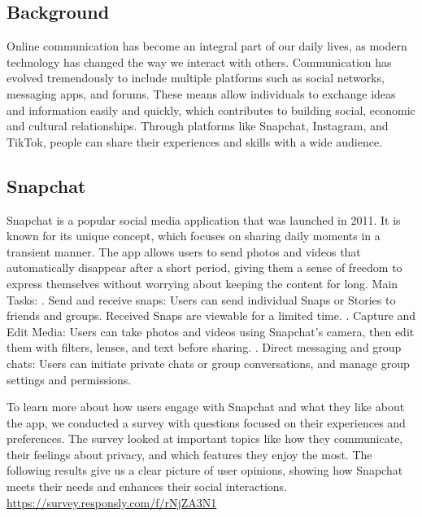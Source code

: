 \documentclass{article}
\begin{document}
\subsection{Background}

Online communication has become an integral part of our daily lives, as modern technology has changed the way we interact with others. Communication has evolved tremendously to include multiple platforms such as social networks, messaging apps, and forums. These means allow individuals to exchange ideas and information easily and quickly, which contributes to building social, economic and cultural relationships. Through platforms like Snapchat, Instagram, and TikTok, people can share their experiences and skills with a wide audience.

\subsection{Snapchat}

Snapchat is a popular social media application that was launched in 2011. It is known for its unique concept, which focuses on sharing daily moments in a transient manner. The app allows users to send photos and videos that automatically disappear after a short period, giving them a sense of freedom to express themselves without worrying about keeping the content for long.
\newline
\newline
Main Tasks:
\newline
{}. Send and receive snaps: Users can send individual Snaps or Stories to friends and groups. Received Snaps are viewable for a limited time.
\newline
{}. Capture and Edit Media: Users can take photos and videos using Snapchat’s camera, then edit them with filters, lenses, and text before sharing.
\newline
{}. Direct messaging and group chats: Users can initiate private chats or group conversations, and manage group settings and permissions.
\newline

To learn more about how users engage with Snapchat and what they like about the app, we conducted a survey with questions focused on their experiences and preferences. The survey looked at important topics like how they communicate, their feelings about privacy, and which features they enjoy the most. The following results give us a clear picture of user opinions, showing how Snapchat meets their needs and enhances their social interactions. \url{https://survey.responsly.com/f/rNjZA3N1}
\end{document}
